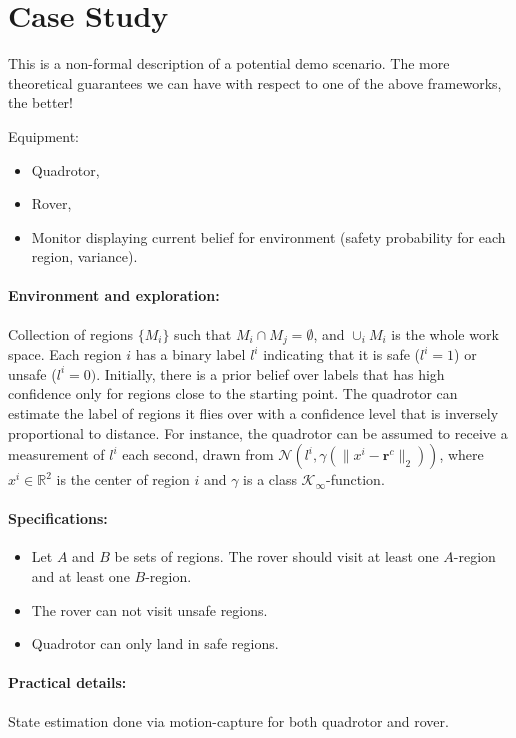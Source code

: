 \documentclass[conference]{IEEEtran}
\begin{document}
\section{Case Study}

This is a non-formal description of a potential demo scenario. The more theoretical guarantees we can have with respect to one of the above frameworks, the better!

Equipment:
\begin{itemize}
  \item Quadrotor,
  \item Rover,
  \item Monitor displaying current belief for environment (safety probability for each region, variance).
\end{itemize}


\paragraph{Environment and exploration:} Collection of regions $\{ M_i \}$ such that $M_i \cap M_j = \emptyset$, and $\cup_i M_i$ is the whole work space. Each region $i$ has a binary label $l^i$ indicating that it is safe ($l^i = 1$) or unsafe ($l^i=0)$. Initially, there is a prior belief over labels that has high confidence only for regions close to the starting point. The quadrotor can estimate the label of regions it flies over with a confidence level that is inversely proportional to distance. For instance, the quadrotor can be assumed to receive a measurement of $l^i$ each second, drawn from $\mathcal N(l^i, \gamma(\| x^i - \mathbf{r}^c \|_2) )$, where $x^i \in \mathbb{R}^2$ is the center of region $i$ and $\gamma$ is a class $\mathcal K_\infty$-function.


\paragraph{Specifications:}

\begin{itemize}
  \item Let $A$ and $B$ be sets of regions. The rover should visit at least one $A$-region and at least one $B$-region.
  \item The rover can not visit unsafe regions.
  \item Quadrotor can only land in safe regions.
\end{itemize}


\paragraph{Practical details:} State estimation done via motion-capture for both quadrotor and rover.
\end{document}
